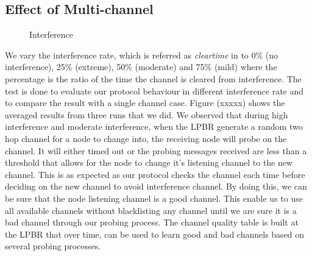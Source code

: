 \subsection{Effect of Multi-channel}


\begin{figure}
\centering
{}                
\caption{Interference}
\label{fig:interference}
\end{figure}

We vary the interference rate, which is referred as \emph{clear\textunderscore time} in \cite{Boano:2010:MSM:2127940.2127963} to 0\% (no interference), 25\% (extreme), 50\% (moderate) and 75\% (mild) where the percentage is the ratio of the time the channel is cleared from interference. The test is done to evaluate our protocol behaviour in different interference rate and to compare the result with a single channel case. Figure (xxxxx) shows the averaged results from three runs that we did. We observed that during high interference and moderate interference, when the LPBR generate a random two hop channel for a node to change into, the receiving node will probe on the channel. It will either timed out or the probing messages received are less than a threshold that allows for the node to change it's listening channel to the new channel. This is as expected as our protocol checks the channel each time before deciding on the new channel to avoid interference channel. By doing this, we can be sure that the node listening channel is a good channel. This enable us to use all available channels without blacklisting any channel until we are sure it is a bad channel through our probing process. The channel quality table is built at the LPBR that over time, can be used to learn good and bad channels based on several probing processes. 

